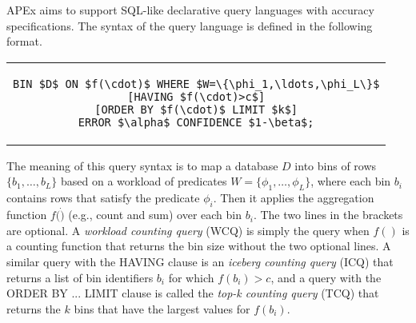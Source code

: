 APEx aims to support SQL-like declarative query languages with accuracy specifications.
The syntax of the query language is defined in the following format.
\begin{center}
\begin{tabular}{c}
\begin{lstlisting}[mathescape=true]
BIN $D$ ON $f(\cdot)$ WHERE $W=\{\phi_1,\ldots,\phi_L\}$
[HAVING $f(\cdot)>c$]
[ORDER BY $f(\cdot)$ LIMIT $k$]
ERROR $\alpha$ CONFIDENCE $1-\beta$;
\end{lstlisting}
\end{tabular}
\end{center}

The meaning of this query syntax is to map a database $D$ into bins of rows $\{b_1,\ldots,b_L\}$ based on a workload of predicates $W=\{\phi_1,\ldots,\phi_L\}$, where each bin $b_i$ contains rows that satisfy the predicate $\phi_i$. Then it applies the aggregation function $f(\dot)$ (e.g., count and sum) over each bin $b_i$.
The two lines in the brackets are optional. A \textit{workload counting query} (WCQ) is simply the query when $f()$ is a counting function that returns the bin size without the two optional lines. A similar query with the HAVING clause is an \textit{iceberg counting query} (ICQ) that returns a list of bin identifiers $b_i$ for which $f(b_i) > c$, and a query with the ORDER BY ... LIMIT clause is called the \textit{top-k counting query} (TCQ) that returns the $k$ bins that have the largest values for $f(b_i)$.

